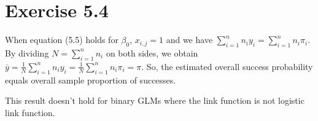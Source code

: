\section*{Exercise 5.4}
When equation (5.5) holds for $\beta_{0}$, $x_{i,j} = 1$ and we have $\sum_{i=1}^{n} n_{i}y_{i} = \sum_{i=1}^{n} n_{i}\pi_{i}$. By dividing $N = \sum_{i=1}^{n} n_{i}$ on both sides, we obtain $\overline{y} = \frac{1}{N}\sum_{i=1}^{n} n_{i}y_{i} = \frac{1}{N}\sum_{i=1}^{n} n_{i}\pi_{i} = \pi$. So, the estimated overall success probability equals overall sample proportion of successes.

This result doesn't hold for binary GLMs where the link function is not logistic link function.
